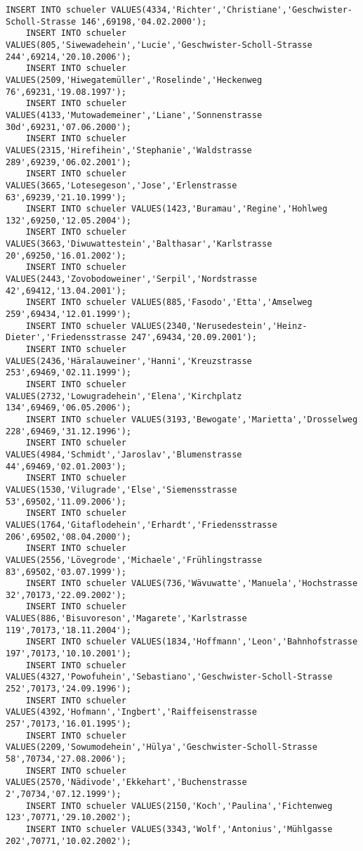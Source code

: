 \begin{lstlisting}[breaklines=True, numbers=none, basicstyle=\tiny, keepspaces=false]
	INSERT INTO schueler VALUES(4334,'Richter','Christiane','Geschwister-Scholl-Strasse 146',69198,'04.02.2000');
	INSERT INTO schueler VALUES(805,'Siwewadehein','Lucie','Geschwister-Scholl-Strasse 244',69214,'20.10.2006');
	INSERT INTO schueler VALUES(2509,'Hiwegatemüller','Roselinde','Heckenweg 76',69231,'19.08.1997');
	INSERT INTO schueler VALUES(4133,'Mutowademeiner','Liane','Sonnenstrasse 30d',69231,'07.06.2000');
	INSERT INTO schueler VALUES(2315,'Hirefihein','Stephanie','Waldstrasse 289',69239,'06.02.2001');
	INSERT INTO schueler VALUES(3665,'Lotesegeson','Jose','Erlenstrasse 63',69239,'21.10.1999');
	INSERT INTO schueler VALUES(1423,'Buramau','Regine','Hohlweg 132',69250,'12.05.2004');
	INSERT INTO schueler VALUES(3663,'Diwuwattestein','Balthasar','Karlstrasse 20',69250,'16.01.2002');
	INSERT INTO schueler VALUES(2443,'Zovobodoweiner','Serpil','Nordstrasse 42',69412,'13.04.2001');
	INSERT INTO schueler VALUES(885,'Fasodo','Etta','Amselweg 259',69434,'12.01.1999');
	INSERT INTO schueler VALUES(2340,'Nerusedestein','Heinz-Dieter','Friedensstrasse 247',69434,'20.09.2001');
	INSERT INTO schueler VALUES(2436,'Häralauweiner','Hanni','Kreuzstrasse 253',69469,'02.11.1999');
	INSERT INTO schueler VALUES(2732,'Lowugradehein','Elena','Kirchplatz 134',69469,'06.05.2006');
	INSERT INTO schueler VALUES(3193,'Bewogate','Marietta','Drosselweg 228',69469,'31.12.1996');
	INSERT INTO schueler VALUES(4984,'Schmidt','Jaroslav','Blumenstrasse 44',69469,'02.01.2003');
	INSERT INTO schueler VALUES(1530,'Vilugrade','Else','Siemensstrasse 53',69502,'11.09.2006');
	INSERT INTO schueler VALUES(1764,'Gitaflodehein','Erhardt','Friedensstrasse 206',69502,'08.04.2000');
	INSERT INTO schueler VALUES(2556,'Lövegrode','Michaele','Frühlingstrasse 83',69502,'03.07.1999');
	INSERT INTO schueler VALUES(736,'Wävuwatte','Manuela','Hochstrasse 32',70173,'22.09.2002');
	INSERT INTO schueler VALUES(886,'Bisuvoreson','Magarete','Karlstrasse 119',70173,'18.11.2004');
	INSERT INTO schueler VALUES(1834,'Hoffmann','Leon','Bahnhofstrasse 197',70173,'10.10.2001');
	INSERT INTO schueler VALUES(4327,'Powofuhein','Sebastiano','Geschwister-Scholl-Strasse 252',70173,'24.09.1996');
	INSERT INTO schueler VALUES(4392,'Hofmann','Ingbert','Raiffeisenstrasse 257',70173,'16.01.1995');
	INSERT INTO schueler VALUES(2209,'Sowumodehein','Hülya','Geschwister-Scholl-Strasse 58',70734,'27.08.2006');
	INSERT INTO schueler VALUES(2570,'Nädivode','Ekkehart','Buchenstrasse 2',70734,'07.12.1999');
	INSERT INTO schueler VALUES(2150,'Koch','Paulina','Fichtenweg 123',70771,'29.10.2002');
	INSERT INTO schueler VALUES(3343,'Wolf','Antonius','Mühlgasse 202',70771,'10.02.2002');

\end{lstlisting}
